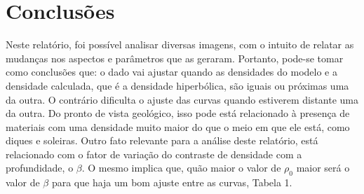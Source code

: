 \section{Conclusões}
Neste relatório, foi possível analisar diversas imagens, com o intuito de relatar as mudanças nos aspectos e parâmetros que as geraram. Portanto, pode-se tomar como conclusões que: o dado vai ajustar quando as densidades do modelo e a densidade calculada, que é a densidade hiperbólica, são iguais ou próximas uma da outra. O contrário dificulta o ajuste das curvas quando estiverem distante uma da outra. Do pronto de vista geológico, isso pode está relacionado à presença de materiais com uma densidade muito maior do que o meio em que ele está, como diques e soleiras. Outro fato relevante para a análise deste relatório, está relacionado com o fator de variação do contraste de densidade com a profundidade, o $\beta$. O mesmo implica que, quão maior o valor de $\rho_0$ maior será o valor de $\beta$ para que haja um bom ajuste entre as curvas, Tabela 1.

\vspace{15cm}
